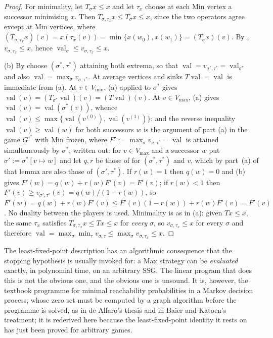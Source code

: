 \documentclass[11pt]{article}
\theoremstyle{plain}
\theoremstyle{definition}
\DeclareMathOperator{\val}{val}
\newcommand{\Vmax}{V_{\max}}
\newcommand{\Vmin}{V_{\min}}
\begin{document}
\begin{proof}
For minimality, let $T_\sigma x\le x$ and let $\tau_x$ choose at each Min
vertex a successor minimising $x$. Then $T_{\sigma,\tau_x}x\le T_\sigma
x\le x$, since the two operators agree except at Min vertices, where
$(T_{\sigma,\tau_x}x)(v)=x(\tau_x(v))=\min\{x(w_0),x(w_1)\}=(T_\sigma
x)(v)$. By , $v_{\sigma,\tau_x}\le x$, hence
$\val_\sigma\le v_{\sigma,\tau_x}\le x$.

(b) By  choose $(\sigma^\ast,\tau^\ast)$ attaining
both extrema, so that $\val=v_{\sigma^\ast,\tau^\ast}=\val_{\sigma^\ast}$
and also $\val=\max_\sigma v_{\sigma,\tau^\ast}$. At average vertices and
sinks $T\val=\val$ is immediate from (a). At $v\in\Vmin$, (a) applied to
$\sigma^\ast$ gives $\val(v)=(T_{\sigma^\ast}\val)(v)=(T\val)(v)$. At
$v\in\Vmax$, (a) gives $\val(v)=\val(\sigma^\ast(v))$, whence
$\val(v)\le\max\{\val(v^{(0)}),\val(v^{(1)})\}$; and the reverse
inequality $\val(v)\ge\val(w)$ for both successors $w$ is the argument of
part (a) in the game $G^{\tau^\ast}$ with Min frozen, where
$F':=\max_\sigma v_{\sigma,\tau^\ast}=\val$ is attained simultaneously by
$\sigma^\ast$; written out: for $v\in\Vmax$ and a successor $w$ put
$\sigma':=\sigma^\ast[v\mapsto w]$ and let $q,r$ be those of
 for $(\sigma^\ast,\tau^\ast)$ and $v$, which by
part~(a) of that lemma are also those of $(\sigma',\tau^\ast)$. If
$r(w)=1$ then $q(w)=0$ and (b) gives
$F'(w)=q(w)+r(w)F'(v)=F'(v)$; if $r(w)<1$ then
$F'(v)\ge v_{\sigma',\tau^\ast}(v)=q(w)/(1-r(w))$, so
$F'(w)=q(w)+r(w)F'(v)\le F'(v)(1-r(w))+r(w)F'(v)=F'(v)$. No duality
between the players is used. Minimality is as in (a): given
$Tx\le x$, the same $\tau_x$ satisfies $T_{\sigma,\tau_x}x\le Tx\le x$
for \emph{every} $\sigma$, so $v_{\sigma,\tau_x}\le x$ for every $\sigma$
and therefore
$\val=\max_\sigma\min_\tau v_{\sigma,\tau}\le\max_\sigma
v_{\sigma,\tau_x}\le x$.
\end{proof}

The least-fixed-point description has an algorithmic consequence that the
stopping hypothesis is usually invoked for: a Max strategy can be
\emph{evaluated} exactly, in polynomial time, on an arbitrary SSG. The
linear program that does this is not the obvious one, and the obvious one
is unsound. It is, however, the textbook programme for minimal reachability
probabilities in a Markov decision process, whose zero set must be computed
by a graph algorithm before the programme is solved, as in de Alfaro's
thesis and in Baier and Katoen's treatment; it is rederived here because
the least-fixed-point identity it rests on has just been proved for
arbitrary games.
\end{document}
